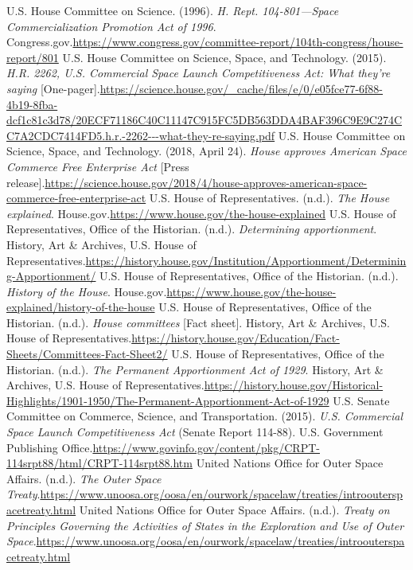 \begin{referencelist}
   U.S. House Committee on Science. (1996). \emph{H. Rept. 104-801—Space Commercialization Promotion Act of 1996}. Congress.gov.\url{https://www.congress.gov/committee-report/104th-congress/house-report/801}
   U.S. House Committee on Science, Space, and Technology. (2015). \emph{H.R. 2262, U.S. Commercial Space Launch Competitiveness Act: What they're saying} [One-pager].\url{https://science.house.gov/_cache/files/e/0/e05fce77-6f88-4b19-8fba-dcf1c81c3d78/20ECF71186C40C11147C915FC5DB563DDA4BAF396C9E9C274CC7A2CDC7414FD5.h.r.-2262---what-they-re-saying.pdf}
   U.S. House Committee on Science, Space, and Technology. (2018, April 24). \emph{House approves American Space Commerce Free Enterprise Act} [Press release].\url{https://science.house.gov/2018/4/house-approves-american-space-commerce-free-enterprise-act}
   U.S. House of Representatives. (n.d.). \emph{The House explained}. House.gov.\url{https://www.house.gov/the-house-explained}
   U.S. House of Representatives, Office of the Historian. (n.d.). \emph{Determining apportionment}. History, Art \& Archives, U.S. House of Representatives.\url{https://history.house.gov/Institution/Apportionment/Determining-Apportionment/}
   U.S. House of Representatives, Office of the Historian. (n.d.). \emph{History of the House}. House.gov.\url{https://www.house.gov/the-house-explained/history-of-the-house}
   U.S. House of Representatives, Office of the Historian. (n.d.). \emph{House committees} [Fact sheet]. History, Art \& Archives, U.S. House of Representatives.\url{https://history.house.gov/Education/Fact-Sheets/Committees-Fact-Sheet2/}
   U.S. House of Representatives, Office of the Historian. (n.d.). \emph{The Permanent Apportionment Act of 1929}. History, Art \& Archives, U.S. House of Representatives.\url{https://history.house.gov/Historical-Highlights/1901-1950/The-Permanent-Apportionment-Act-of-1929}
   U.S. Senate Committee on Commerce, Science, and Transportation. (2015). \emph{U.S. Commercial Space Launch Competitiveness Act} (Senate Report 114-88). U.S. Government Publishing Office.\url{https://www.govinfo.gov/content/pkg/CRPT-114srpt88/html/CRPT-114srpt88.htm}
   United Nations Office for Outer Space Affairs. (n.d.). \emph{The Outer Space Treaty}.\url{https://www.unoosa.org/oosa/en/ourwork/spacelaw/treaties/introouterspacetreaty.html}
   United Nations Office for Outer Space Affairs. (n.d.). \emph{Treaty on Principles Governing the Activities of States in the Exploration and Use of Outer Space}.\url{https://www.unoosa.org/oosa/en/ourwork/spacelaw/treaties/introouterspacetreaty.html}

\end{referencelist}
